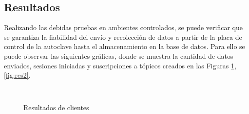 \subsection{Resultados}
Realizando las debidas pruebas en ambientes controlados, se puede verificar que se garantiza la fiabilidad del envío y recolección de datos a partir de la placa de control de la autoclave hasta el almacenamiento en la base de datos. Para ello se puede observar las siguientes gráficas, donde se muestra la cantidad de datos enviados, sesiones iniciadas y suscripciones a tópicos creados en las Figuras \ref{fig:res1},\ref{fig:res2}.
\begin{figure}[hpt]
    \centering
    \caption{Resultados de clientes}
            \par        %
        \\
    \label{fig:res1}
\end{figure}
\newpage
